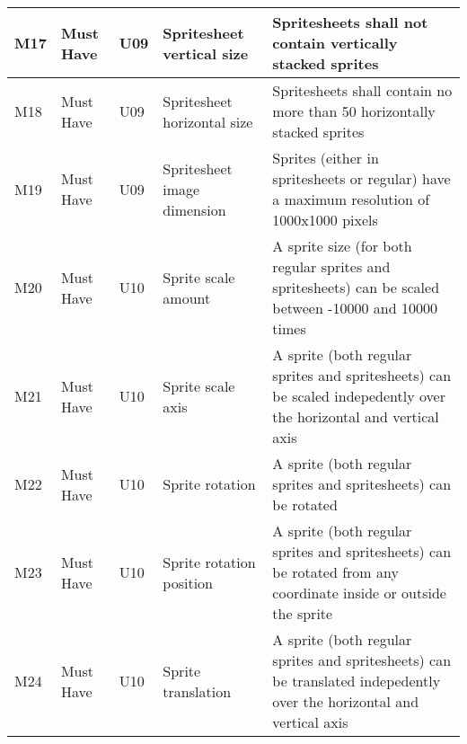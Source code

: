 \documentclass{article} %
\begin{document}
\begin{longtable}{|p{}|p{}|p{}|p{}|p{}|}
    M17                         & Must Have                          & U09                & Spritesheet vertical size   & Spritesheets shall not contain vertically stacked sprites                                                                                                   \\ \hline
    M18                         & Must Have                          & U09                & Spritesheet horizontal size & Spritesheets shall contain no more than 50 horizontally stacked sprites                                                                                     \\ \hline
    M19                         & Must Have                          & U09                & Spritesheet image dimension & Sprites (either in spritesheets or regular) have a maximum resolution of 1000x1000 pixels                                                                   \\ \hline
    M20                         & Must Have                          & U10                & Sprite scale amount         & A sprite size (for both regular sprites and spritesheets) can be scaled between -10000 and 10000 times                                                      \\ \hline
    M21                         & Must Have                          & U10                & Sprite scale axis           & A sprite (both regular sprites and spritesheets) can be scaled indepedently over the horizontal and vertical axis                                           \\ \hline
    M22                         & Must Have                          & U10                & Sprite rotation             & A sprite (both regular sprites and spritesheets) can be rotated                                                                                             \\ \hline
    M23                         & Must Have                          & U10                & Sprite rotation position    & A sprite (both regular sprites and spritesheets) can be rotated from any coordinate inside or outside the sprite                                            \\ \hline
    M24                         & Must Have                          & U10                & Sprite translation          & A sprite (both regular sprites and spritesheets) can be translated indepedently over the horizontal and vertical axis                                       \\ \hline

\end{longtable}
\end{document}
